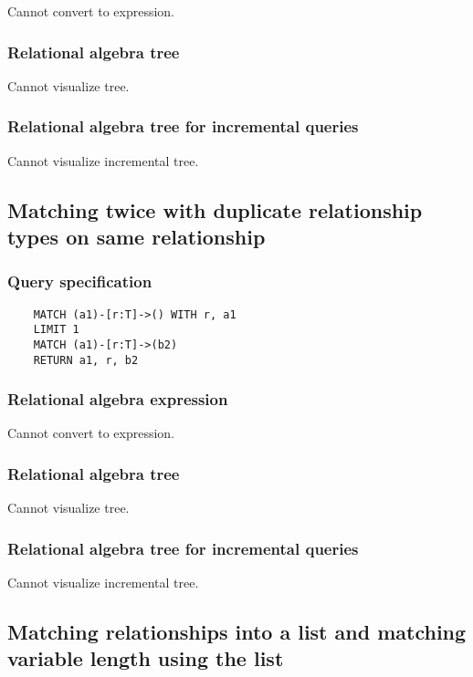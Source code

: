 	Cannot convert to expression.

	\subsubsection*{Relational algebra tree}

	Cannot visualize tree.

	\subsubsection*{Relational algebra tree for incremental queries}

	Cannot visualize incremental tree.
	\subsection{Matching twice with duplicate relationship types on same relationship}

	\subsubsection*{Query specification}

	\begin{lstlisting}
	MATCH (a1)-[r:T]->() WITH r, a1
	LIMIT 1
	MATCH (a1)-[r:T]->(b2)
	RETURN a1, r, b2
	\end{lstlisting}


	\subsubsection*{Relational algebra expression}

	Cannot convert to expression.

	\subsubsection*{Relational algebra tree}

	Cannot visualize tree.

	\subsubsection*{Relational algebra tree for incremental queries}

	Cannot visualize incremental tree.
	\subsection{Matching relationships into a list and matching variable length using the list}

